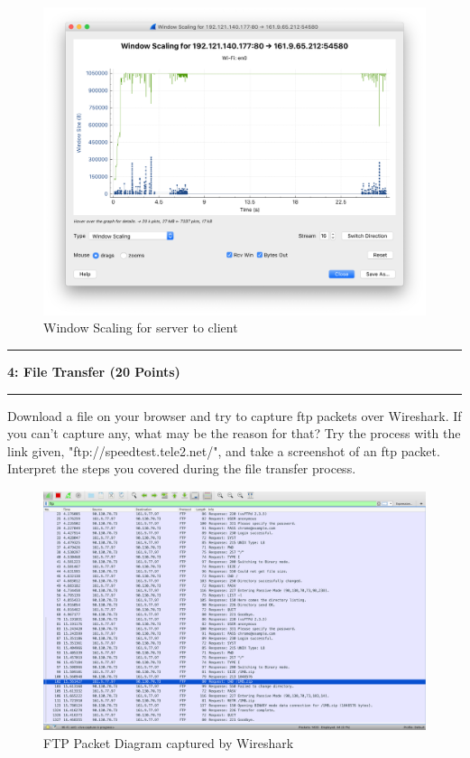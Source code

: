 \documentclass[11pt]{article}
\newcommand\question[2]{\vspace{.25in}\hrule\textbf{#1: #2}\vspace{.5em}\hrule\vspace{.10in}}
\begin{document}
	
	\begin{figure}[H]
		\centering
		\includegraphics[width=0.7\linewidth]{window_scale2}
		\caption{Window Scaling for server to client}
	\end{figure}

	\clearpage
	
	\question{4}{File Transfer (20 Points)}
	
	Download a file on your browser and try to capture ftp packets over Wireshark. If you can't capture any, what may be the reason for that? Try the process with the link given, "ftp://speedtest.tele2.net/", and take a screenshot of an ftp packet. Interpret the steps you covered during the file transfer process.
	
	\begin{figure}[H]
		\centering
		\includegraphics[width=1\linewidth]{ftp}
		\caption{FTP Packet Diagram captured by Wireshark}
	\end{figure}
\end{document}

